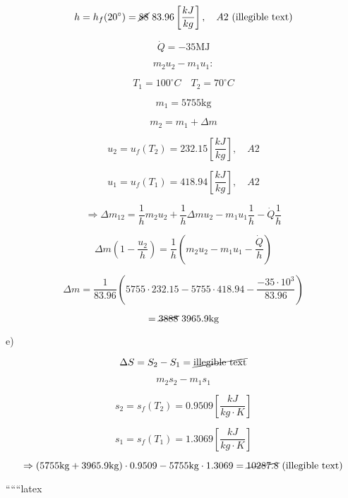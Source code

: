 \[
h = h_f(20^\circ) = \cancel{88} \ 83.96 \left[\frac{kJ}{kg}\right], \quad A2 \ (\text{illegible text})
\]

\[
\dot{Q} = -35 \text{MJ}
\]

\[
m_2 u_2 - m_1 u_1:
\]

\[
T_1 = 100^\circ C \quad T_2 = 70^\circ C
\]

\[
m_1 = 5755 \text{kg}
\]

\[
m_2 = m_1 + \Delta m
\]

\[
u_2 = u_f(T_2) = 232.15 \left[\frac{kJ}{kg}\right], \quad A2
\]

\[
u_1 = u_f(T_1) = 418.94 \left[\frac{kJ}{kg}\right], \quad A2
\]

\[
\Rightarrow \Delta m_{12} = \frac{1}{h} m_2 u_2 + \frac{1}{h} \Delta m u_2 - m_1 u_1 \frac{1}{h} - \dot{Q} \frac{1}{h}
\]

\[
\Delta m \left(1 - \frac{u_2}{h}\right) = \frac{1}{h} (m_2 u_2 - m_1 u_1 - \frac{\dot{Q}}{h})
\]

\[
\Delta m = \frac{1}{83.96} (5755 \cdot 232.15 - 5755 \cdot 418.94 - \frac{-35 \cdot 10^3}{83.96})
\]

\[
= \cancel{3888} \ 3965.9 \text{kg}
\]

e)

\[
\Delta S = S_2 - S_1 = \cancel{\text{illegible text}}
\]

\[
m_2 s_2 - m_1 s_1
\]

\[
s_2 = s_f(T_2) = 0.9509 \left[\frac{kJ}{kg \cdot K}\right]
\]

\[
s_1 = s_f(T_1) = 1.3069 \left[\frac{kJ}{kg \cdot K}\right]
\]

\[
\Rightarrow (5755 \text{kg} + 3965.9 \text{kg}) \cdot 0.9509 - 5755 \text{kg} \cdot 1.3069 = \cancel{10287.8} \ (\text{illegible text})
\]

``````latex


